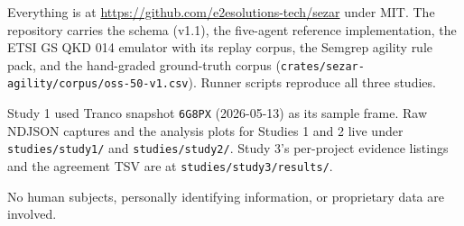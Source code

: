 Everything is at \url{https://github.com/e2esolutions-tech/sezar} under
MIT. The repository carries the schema (v1.1), the five-agent reference
implementation, the ETSI GS QKD 014 emulator with its replay corpus, the
Semgrep agility rule pack, and the hand-graded ground-truth corpus
(\texttt{crates/sezar-agility/corpus/oss-50-v1.csv}). Runner scripts
reproduce all three studies.

Study 1 used Tranco snapshot \texttt{6G8PX} (2026-05-13) as its sample
frame. Raw NDJSON captures and the analysis plots for Studies 1 and 2
live under \texttt{studies/study1/} and \texttt{studies/study2/}. Study
3's per-project evidence listings and the agreement TSV are at
\texttt{studies/study3/results/}.

No human subjects, personally identifying information, or proprietary
data are involved.

